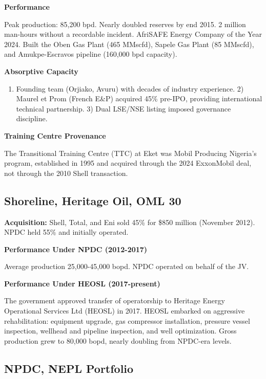 \textbf{Performance}

Peak production: 85,200 bpd. Nearly doubled reserves by end 2015. 2
million man-hours without a recordable incident. AfriSAFE Energy Company
of the Year 2024. Built the Oben Gas Plant (465 MMscfd), Sapele Gas
Plant (85 MMscfd), and Amukpe-Escravos pipeline (160,000 bpd capacity).

\textbf{Absorptive Capacity}

\begin{enumerate}
\def\labelenumi{\arabic{enumi})}
\tightlist
\item
  Founding team (Orjiako, Avuru) with decades of industry experience. 2)
  Maurel et Prom (French E\&P) acquired 45\% pre-IPO, providing
  international technical partnership. 3) Dual LSE/NSE listing imposed
  governance discipline.
\end{enumerate}

\textbf{Training Centre Provenance}

The Transitional Training Centre (TTC) at Eket was Mobil Producing
Nigeria's program, established in 1995 and acquired through the 2024
ExxonMobil deal, not through the 2010 Shell transaction.

\hypertarget{shoreline-heritage-oil-oml-30}{%
\subsection{Shoreline, Heritage Oil, OML
30}\label{shoreline-heritage-oil-oml-30}}

\textbf{Acquisition:} Shell, Total, and Eni sold 45\% for \$850 million
(November 2012). NPDC held 55\% and initially operated.

\textbf{Performance Under NPDC (2012-2017)}

Average production 25,000-45,000 bopd. NPDC operated on behalf of the
JV.

\textbf{Performance Under HEOSL (2017-present)}

The government approved transfer of operatorship to Heritage Energy
Operational Services Ltd (HEOSL) in 2017. HEOSL embarked on aggressive
rehabilitation: equipment upgrade, gas compressor installation, pressure
vessel inspection, wellhead and pipeline inspection, and well
optimization. Gross production grew to 80,000 bopd, nearly doubling from
NPDC-era levels.

\hypertarget{npdc-nepl-portfolio}{%
\subsection{NPDC, NEPL Portfolio}\label{npdc-nepl-portfolio}}

